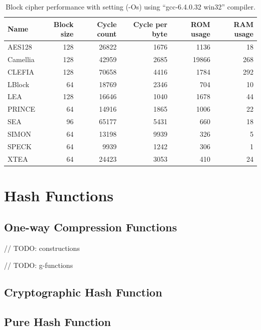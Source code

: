 \documentclass[sigconf, review=false]{acmart}
\begin{document}
\begin{table}[tbp]
\centering
\caption{Block cipher performance with setting (-Os) using ``gcc-6.4.0.32 win32'' compiler.}
\label{tab-size}
\begin{tabular}{lrrrrr}
    \toprule
Name     & Block size & Cycle count & Cycle per byte & ROM usage & RAM usage \\
    \midrule
AES128   & 128        & 26822       & 1676           & 1136      & 18        \\
Camellia & 128        & 42959       & 2685           & 19866     & 268       \\
CLEFIA   & 128        & 70658       & 4416           & 1784      & 292       \\
LBlock   & 64         & 18769       & 2346           & 704       & 10        \\
LEA      & 128        & 16646       & 1040           & 1678      & 44        \\
PRINCE   & 64         & 14916       & 1865           & 1006      & 22        \\
SEA      & 96         & 65177       & 5431           & 660       & 18        \\
SIMON    & 64         & 13198       & 9939           & 326       & 5         \\
SPECK    & 64         & 9939        & 1242           & 306       & 1         \\
XTEA     & 64         & 24423       & 3053           & 410       & 24       \\
    \bottomrule
\end{tabular}
\end{table}



\section{Hash Functions}
\subsection{One-way Compression Functions} \label{sec-one}
// TODO: constructions

// TODO: g-functions

\subsection{Cryptographic Hash Function}

\subsection{Pure Hash Function}
\end{document}
